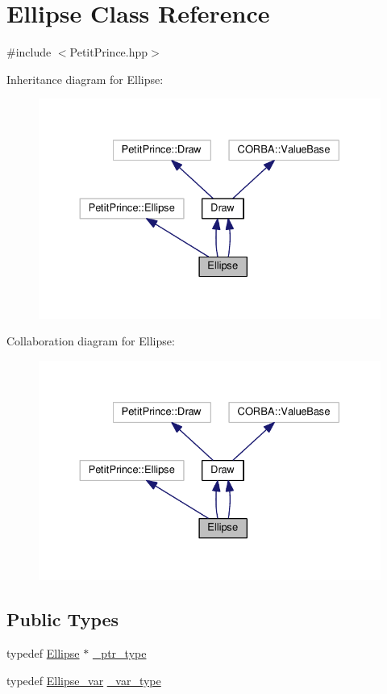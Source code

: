 \hypertarget{class_ellipse}{}\section{Ellipse Class Reference}
\label{class_ellipse}


{\ttfamily \#include $<$Petit\+Prince.\+hpp$>$}



Inheritance diagram for Ellipse\+:
\nopagebreak
\begin{figure}[H]
\begin{center}
\leavevmode
\includegraphics[width=330pt]{class_ellipse__inherit__graph}
\end{center}
\end{figure}


Collaboration diagram for Ellipse\+:
\nopagebreak
\begin{figure}[H]
\begin{center}
\leavevmode
\includegraphics[width=330pt]{class_ellipse__coll__graph}
\end{center}
\end{figure}
\subsection*{Public Types}
\begin{DoxyCompactItemize}
\item 
typedef \hyperlink{class_ellipse}{Ellipse} $\ast$ \hyperlink{class_ellipse_ac03e9a197e4d346d6a7f4360f83affdc}{\+\_\+ptr\+\_\+type}
\item 
typedef \hyperlink{_petit_prince_8hpp_a2e82f3c0eab1432cbb901c90c56b845d}{Ellipse\+\_\+var} \hyperlink{class_ellipse_af5ce6e507c505dcd1b6ef888b904616f}{\+\_\+var\+\_\+type}
\end{DoxyCompactItemize}
